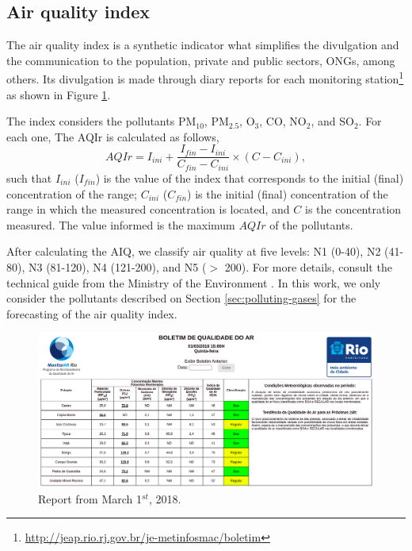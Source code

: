 \subsection{Air quality index}

The air quality index is a synthetic indicator what simplifies the divulgation
and the communication to the population, private and public sectors, ONGs,
among others.
Its divulgation is made through diary reports for each monitoring
station\footnote{\url{http://jeap.rio.rj.gov.br/je-metinfosmac/boletim}} as
shown in Figure \ref{fig:boletim}. 

The index considers the pollutants PM$_{10}$, PM$_{2.5}$, O$_3$,
CO, NO$_2$, and SO$_2$. For each one, The AQIr is calculated as follows,
\begin{equation}
    \label{eq:AQI}
    AQIr = I_{ini} + \frac{I_{fin} - I_{ini}}{C_{fin} - C_{ini}} \times (C - C_{ini}), 
\end{equation}
such that $I_{ini}$ ($I_{fin}$) is the value of the index that corresponds to
the initial (final) concentration of the range; $C_{ini}$ ($C_{fin}$) is the
initial (final) concentration of the range in which the measured concentration
is located, and $C$ is the concentration measured. The value informed is the
maximum $AQIr$ of the pollutants. 

After calculating the AIQ, we classify air quality at five levels: N1 (0-40),
N2 (41-80), N3 (81-120), N4 (121-200), and N5 ($>$ 200). For more details,
consult the technical guide from the Ministry of the Environment
\cite{guia-tecnico-mma}. In this work, we only consider the pollutants
described on Section \ref{sec:polluting-gases} for the forecasting of the air
quality index. 

\begin{figure}[!ht]  
    \includegraphics[width=\linewidth]{../images/boletim01-03-2018.png}
    \caption{Report from March 1$^{st}$, 2018.}
    \label{fig:boletim}
\end{figure}




